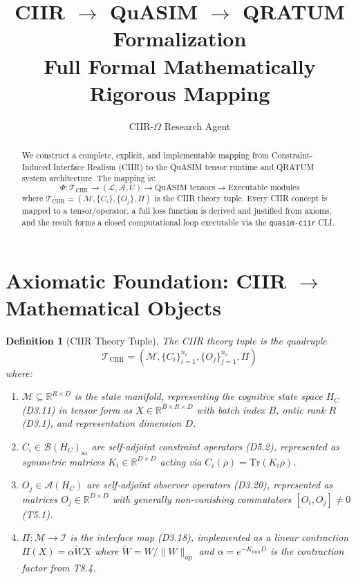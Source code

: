 \documentclass[11pt,a4paper]{article}
\title{CIIR $\to$ QuASIM $\to$ QRATUM Formalization\\
\large Full Formal Mathematically Rigorous Mapping}
\author{CIIR-$\Omega$ Research Agent}
\date{}
\newtheorem{definition}{Definition}[section]
\newcommand{\CM}{\mathcal{M}}
\newcommand{\HC}{H_C}
\newcommand{\CB}{\mathcal{B}}
\newcommand{\CA}{\mathcal{A}}
\newcommand{\CL}{\mathcal{L}}
\newcommand{\Tr}{\mathrm{Tr}}
\begin{document}
\maketitle

\begin{abstract}
We construct a complete, explicit, and implementable mapping from
Constraint-Induced Interface Realism (CIIR) to the QuASIM tensor
runtime and QRATUM system architecture.  The mapping is:
\[
  \Phi: \mathcal{T}_{\mathrm{CIIR}} \to (\CL, \CA, U)
    \to \text{QuASIM tensors} \to \text{Executable modules}
\]
where $\mathcal{T}_{\mathrm{CIIR}} = (\CM, \{C_i\}, \{O_j\}, \Pi)$
is the CIIR theory tuple.  Every CIIR concept is mapped to a
tensor/operator, a full loss function is derived and justified from
axioms, and the result forms a closed computational loop executable
via the \texttt{quasim-ciir} CLI.
\end{abstract}

\section{Axiomatic Foundation: CIIR $\to$ Mathematical Objects}
\label{sec:foundation}

\begin{definition}[CIIR Theory Tuple]
\label{def:theory-tuple}
The CIIR theory tuple is the quadruple
\[
  \mathcal{T}_{\mathrm{CIIR}} = (\CM, \{C_i\}_{i=1}^{n_c},
    \{O_j\}_{j=1}^{n_o}, \Pi)
\]
where:
\begin{enumerate}
  \item $\CM \subseteq \mathbb{R}^{R \times D}$ is the state manifold,
    representing the cognitive state space $\HC$ (D3.11) in tensor form
    as $X \in \mathbb{R}^{B \times R \times D}$ with batch index $B$,
    ontic rank $R$ (D3.1), and representation dimension $D$.
  \item $C_i \in \CB(\HC)_{\mathrm{sa}}$ are self-adjoint constraint
    operators (D5.2), represented as symmetric matrices $K_i \in
    \mathbb{R}^{D \times D}$ acting via $C_i(\rho) = \Tr(K_i \rho)$.
  \item $O_j \in \CA(\HC)$ are self-adjoint observer operators (D3.20),
    represented as matrices $O_j \in \mathbb{R}^{D \times D}$ with
    generally non-vanishing commutators $[O_i, O_j] \neq 0$ (T5.1).
  \item $\Pi: \CM \to \mathcal{I}$ is the interface map (D3.18),
    implemented as a linear contraction $\Pi(X) = \alpha \tilde{W} X$
    where $\tilde{W} = W / \|W\|_{\mathrm{op}}$ and
    $\alpha = e^{-K_{\min} D}$ is the contraction factor from T8.4.
\end{enumerate}
\end{definition}
\end{document}
